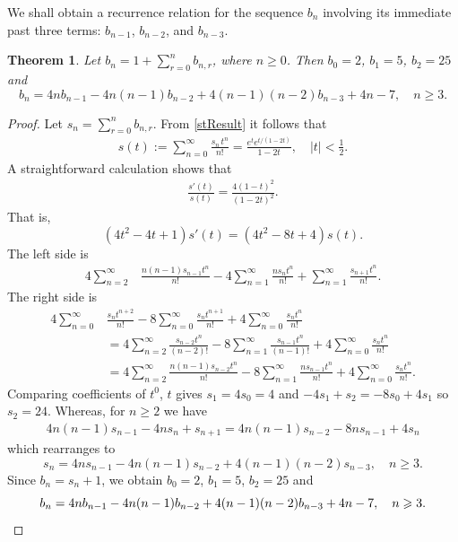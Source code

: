 \documentclass[11pt]{article}
\newtheorem{theorem}{Theorem}[section]
\newcommand{\q}{\quad}
\newcommand{\ges}{\geqslant}
\begin{document}
We shall obtain a recurrence relation for the sequence $b_n$ involving its immediate past three terms: $b_{n-1}$, $b_{n-2}$, and $b_{n-3}$.
\begin{theorem} {\label{th:pureRecursion}}
Let  $b_n=1+\sum\limits_{r=0}^nb_{n,r}$, where $n\ges 0$.  Then 
$b_0=2$, $b_1=5$, $b_2=25$ and
\[
b_n=4nb_{n-1}-4n(n-1)b_{n-2}+4(n-1)(n-2)b_{n-3}+4n-7,\q n\ges 3.
\]

\end{theorem}
\begin{proof} 
Let $s_n=\sum_{r=0}^nb_{n,r}$. From \eqref{stResult} it follows that
\begin{align*}
s(t):=\sum_{n=0}^\infty\frac{ s_n\,t^n}{n!}=\frac{e^te^{t/(1-2t)}}{1-2t},\q |t|<\tfrac12.
\end{align*}
A straightforward calculation shows that
\begin{align*}
 \frac{s'(t)}{s(t)}=\frac{4(1-t)^2}{(1-2t)^2}.
\end{align*}
That is,
\[
(4t^2-4t+1)s'(t)=(4t^2-8t+4)s(t).
\]
The left side is
\begin{align*}
4\sum_{n=2}^\infty &\frac{ n(n-1)s_{n-1}t^n}{n!}-4\sum_{n=1}^\infty\frac{ns_nt^n}{n!}
+\sum_{n=1}^\infty\frac{s_{n+1}t^n}{n!}.
\end{align*}
The right side is
\begin{align*}
4\sum_{n=0}^\infty &\frac{ s_{n}t^{n+2}}{n!}-8\sum_{n=0}^\infty\frac{s_nt^{n+1}}{n!}
+4\sum_{n=0}^\infty\frac{s_{n}t^n}{n!}\\[6pt]
&=4\sum_{n=2}^\infty \frac{ s_{n-2}t^{n}}{(n-2)!}-8\sum_{n=1}^\infty\frac{s_{n-1}t^{n}}{(n-1 )!}
+4\sum_{n=0}^\infty\frac{s_{n}t^n}{n!}\\[6pt]
&=4\sum_{n=2}^\infty \frac{ n(n-1)s_{n-2}t^{n}}{n!}-8\sum_{n=1}^\infty\frac{ns_{n-1}t^{n}}{n!}
+4\sum_{n=0}^\infty\frac{s_{n}t^n}{n!}.
\end{align*}
Comparing coefficients of $t^0$, $t$ gives $s_1=4s_0=4$ and 
$-4s_1+s_2=-8s_0+4s_1$ so $ s_2=24$.
Whereas, for $n\ges 2$ we have
\begin{align*}
4n(n-1)s_{n-1}-4ns_n+s_{n+1}=4n(n-1)s_{n-2}-8ns_{n-1}+4s_n
\end{align*}
which rearranges to 
\[
s_n=4ns_{n-1}-4n(n-1)s_{n-2}+4(n-1)(n-2)s_{n-3},\q n\ges 3. 
\]
Since $b_n=s_n+1$, we obtain
$b_0=2$, $b_1=5$, $b_2=25$ and
\[
b_n=4nb_{n-1}-4n(n-1)b_{n-2}+4(n-1)(n-2)b_{n-3}+4n-7,\q n\ges 3.\qedhere
\]
\end{proof}
\end{document}
